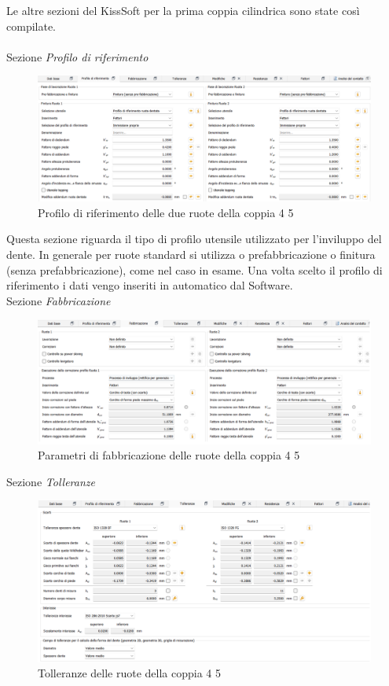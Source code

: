 Le altre sezioni del KissSoft per la prima coppia cilindrica sono state così compilate.\\
\\
Sezione \emph{Profilo di riferimento}
\begin{figure}[h]
    \centering
    \includegraphics[scale=0.5]{Immagini/ProfiloRiferimentoCoppia45.png}
    \caption{Profilo di riferimento delle due ruote della coppia 4 5}
    \label{fig:ProfiloRiferimentoCoppia45}
\end{figure}

Questa sezione riguarda il tipo di profilo utensile utilizzato per l’inviluppo del dente. 
In generale per ruote standard si utilizza o prefabbricazione o finitura (senza prefabbricazione), come nel caso in esame. Una volta scelto il profilo di riferimento i dati vengo inseriti in automatico dal Software.\\
\newpage
Sezione \emph{Fabbricazione}
\begin{figure}[h]
    \centering
    \includegraphics[scale=0.35]{Immagini/FabbricazioneCoppia45.png}
    \caption{Parametri di fabbricazione delle ruote della coppia 4 5 }
    \label{fig:FabbricazioneCoppia45}
\end{figure}

Sezione \emph{Tolleranze}
\begin{figure}[h]
    \centering
    \includegraphics[scale=0.4]{Immagini/TolleranzeCoppia45.png}
    \caption{Tolleranze delle ruote della coppia 4 5}
    \label{fig:TolleranzeCoppia45}
\end{figure}

